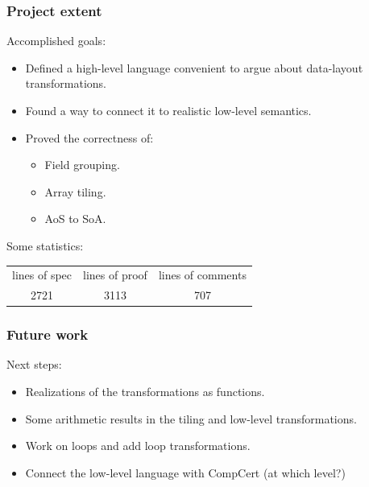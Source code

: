 \begin{frame}[fragile]
\frametitle{Project extent}

Accomplished goals:
\\[0.7em]
\begin{itemize}
	\setlength\itemsep{1.2em}
	\item Defined a high-level language convenient to argue about data-layout transformations. \pause
	\item Found a way to connect it to realistic low-level semantics. \pause
	\item Proved the correctness of:
	\begin{itemize}
		\item Field grouping.
		\item Array tiling.
		\item AoS to SoA.
	\end{itemize}
\end{itemize}

\bigskip \pause

Some statistics:
\begin{center}
\begin{tabular}{ccc}
lines of spec & lines of proof & lines of comments \\
2721 & 3113 & 707
\end{tabular}
\end{center}

\end{frame}


\begin{frame}[fragile]
\frametitle{Future work}

Next steps:
\\[0.7em]
\begin{itemize}
	\setlength\itemsep{1.5em}
	\item Realizations of the transformations as functions. %
	\item Some arithmetic results in the tiling and low-level transformations. %
	\item Work on loops and add loop transformations.%
	\item Connect the low-level language with CompCert (at which level?) %
\end{itemize}

\end{frame}


\begin{frame}[fragile]
\frametitle{}


\end{frame}




